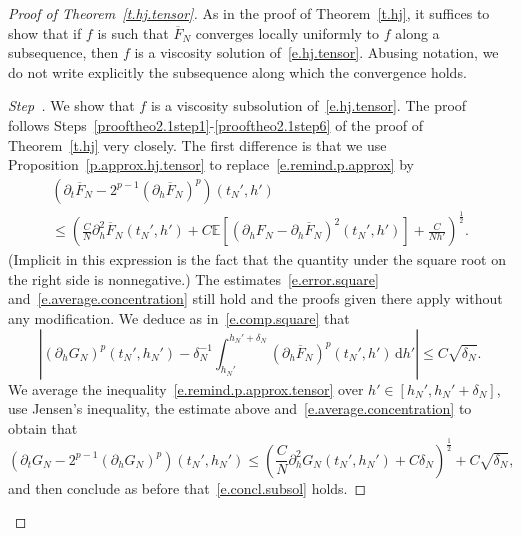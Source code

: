 \documentclass[10pt]{amsart}
\theoremstyle{definition}\newtheorem{defi}[theo]{Definition}\newtheorem{rema}[theo]{Remark}\newtheorem{exam}[theo]{Example}\newtheorem{exem}[theo]{Example}\newtheorem{nota}[theo]{Notation}
\newcommand{\E}{\mathbb{E}}
\renewcommand{\d}{\mathrm{d}}
\newcommand{\1}{\mathds{1}}
\renewcommand{\le}{\leqslant}
\renewcommand{\bar}{\overline}
\newcommand{\de}{\delta}
\newcounter{stepcount}
\newenvironment{step}{\refstepcounter{stepcount}\begin{proof}[Step~\thestepcount]}{\let\qed\relax\end{proof}}
\begin{document}
\begin{proof}[Proof of Theorem~\ref{t.hj.tensor}]
As in the proof of Theorem~\ref{t.hj}, it suffices to show that if $f$ is such that $\bar F_N$ converges locally uniformly to $f$ along a subsequence, then $f$ is a viscosity solution of~\eqref{e.hj.tensor}. Abusing notation, we do not write explicitly the subsequence along which the convergence holds.



\setcounter{stepcount}{0}
\begin{step}
We show that $f$ is a viscosity subsolution of~\eqref{e.hj.tensor}. The proof follows Steps~\ref{prooftheo2.1step1}-\ref{prooftheo2.1step6} of the proof of Theorem~\ref{t.hj} very closely. The first difference is that we use Proposition~\ref{p.approx.hj.tensor} to replace~\eqref{e.remind.p.approx} by
\begin{multline}\label{e.remind.p.approx.tensor}
\left(\partial_t \bar F_N - 2^{p-1} (\partial_h \bar F_N)^p \right)\left(t_N',h'\right)
\\
\le
\left(\frac C {N} \partial_{h}^2 \bar F_N\left(t_N',h'\right) + C \E \left[\left(\partial_h F_N - \partial_h \bar F_N\right)^2(t_N',h') \right] +\frac{C}{Nh'}\right)^\frac 1 2.
\end{multline}
(Implicit in this expression is the fact that the quantity under the square root on the right side is nonnegative.) The estimates~\eqref{e.error.square} and~\eqref{e.average.concentration} still hold and the proofs given there apply without any modification. We deduce as in~\eqref{e.comp.square} that
\[
\left|\left(\partial_h G_N\right)^p\left(t_N',h_N'\right) - \de_N^{-1}\int_{h_N'}^{h_N' + \de_N} \left(\partial_h \bar F_N\right)^p\left(t_N',h'\right) \, \d h' \right|
\le C \sqrt{\de_N}.
\]
We average the inequality~\eqref{e.remind.p.approx.tensor} over $h' \in [h_N',h_N' + \de_N]$, use Jensen's inequality, the estimate above and~\eqref{e.average.concentration} to obtain that
\[
\left(\partial_t G_N - 2^{p-1} \left(\partial_h G_N\right)^p \right)(t_N',h_N')
\le
\left(\frac C {N} \partial_{h}^2 G_N\left(t_N',h_N'\right) + C \de_N \right)^\frac 1 2 + C \sqrt{\de_N},
\]
and then conclude as before that~\eqref{e.concl.subsol} holds.
\end{step}\label{prooftheo5.1Step1}


\end{proof}
\end{document}
